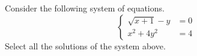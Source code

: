 \documentclass{ximera}
\author{Kenneth Berglund}
\begin{document}
\begin{exercise}
Consider the following system of equations.
$$
\begin{cases}
\sqrt{x + 1} - y & = 0 \\
x^2 + 4y^2 & = 4
\end{cases}
$$
Select all the solutions of the system above.
\begin{selectAll}
\end{selectAll}

\end{exercise}
\end{document}
